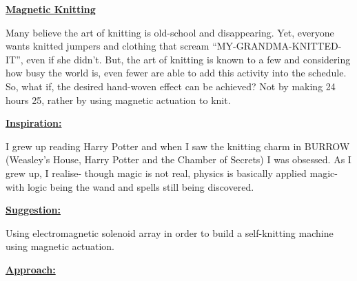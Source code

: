 \documentclass[10pt]{article}
\newcommand{\sectionlabel}[1]{\par\textbf{\underline{#1}}\par}
\begin{document}
\sectionlabel{Magnetic Knitting}

Many believe the art of knitting is old-school and disappearing. Yet, everyone wants knitted jumpers and clothing that scream ``MY-GRANDMA-KNITTED-IT'', even if she didn't. But, the art of knitting is known to a few and considering how busy the world is, even fewer are able to add this activity into the schedule. So, what if, the desired hand-woven effect can be achieved? Not by making 24 hours 25, rather by using magnetic actuation to knit.

\sectionlabel{Inspiration:}

I grew up reading Harry Potter and when I saw the knitting charm in BURROW (Weasley's House, Harry Potter and the Chamber of Secrets) I was obsessed. As I grew up, I realise- though magic is not real, physics is basically applied magic- with logic being the wand and spells still being discovered.

\sectionlabel{Suggestion:}

Using electromagnetic solenoid array in order to build a self-knitting machine using magnetic actuation.

\sectionlabel{Approach:}
\end{document}
